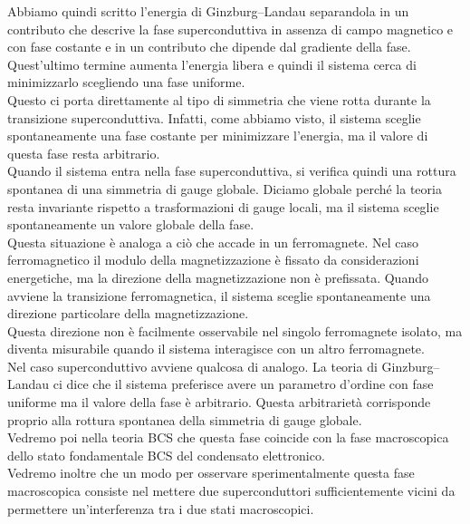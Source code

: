 Abbiamo quindi scritto l'energia di Ginzburg--Landau separandola in un contributo che descrive la fase superconduttiva in assenza di campo magnetico e con fase costante e in un contributo che dipende dal gradiente della fase.\\
Quest'ultimo termine aumenta l'energia libera e quindi il sistema cerca di minimizzarlo scegliendo una fase uniforme.\\
Questo ci porta direttamente al tipo di simmetria che viene rotta durante la transizione superconduttiva. Infatti, come abbiamo visto, il sistema sceglie spontaneamente una fase costante per minimizzare l'energia, ma il valore di questa fase resta arbitrario.\\
Quando il sistema entra nella fase superconduttiva, si verifica quindi una rottura spontanea di una simmetria di gauge globale. Diciamo globale perché la teoria resta invariante rispetto a trasformazioni di gauge locali, ma il sistema sceglie spontaneamente un valore globale della fase.\\
Questa situazione è analoga a ciò che accade in un ferromagnete. Nel caso ferromagnetico il modulo della magnetizzazione è fissato da considerazioni energetiche, ma la direzione della magnetizzazione non è prefissata. Quando avviene la transizione ferromagnetica, il sistema sceglie spontaneamente una direzione particolare della magnetizzazione.\\
Questa direzione non è facilmente osservabile nel singolo ferromagnete isolato, ma diventa misurabile quando il sistema interagisce con un altro ferromagnete.\\
Nel caso superconduttivo avviene qualcosa di analogo. La teoria di Ginzburg--Landau ci dice che il sistema preferisce avere un parametro d'ordine con fase uniforme ma il valore della fase è arbitrario. Questa arbitrarietà corrisponde proprio alla rottura spontanea della simmetria di gauge globale.\\
Vedremo poi nella teoria BCS che questa fase coincide con la fase macroscopica dello stato fondamentale BCS del condensato elettronico.\\
Vedremo inoltre che un modo per osservare sperimentalmente questa fase macroscopica consiste nel mettere due superconduttori sufficientemente vicini da permettere un'interferenza tra i due stati macroscopici.\\
